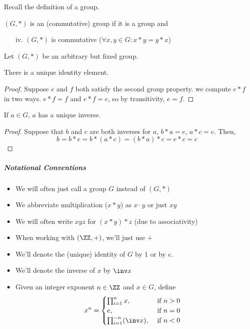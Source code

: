 \documentclass[notes.tex]{subfiles}
\begin{document}

Recall the definition of a group.
\begin{defn}
	$(G, *)$ is an  (commutative) group if it is a group and
\end{defn}
\begin{enumerate}
	\item[iv.] $(G, *)$ is commutative ($\forall x, y\in G: x*y = y*x$)
\end{enumerate}

Let $(G, *)$ be an arbitrary but fixed group.

\begin{proposition}
	There is a unique identity element.
\end{proposition}

\begin{proof}
	Suppose $e$ and $f$ both satisfy the second group property.
	we compute $e*f$ in two ways. $e*f = f$ and $e*f = e$, so by transitivity, $e = f$.
\end{proof}

\begin{proposition}
	If $a\in G$, $a$ has a unique inverse.
\end{proposition}

\begin{proof}
	Suppose that $b$ and $c$ are both inverses for $a$, $b*a = e$, $a*c = e$.
	Then, \[
		b = b*e = b*(a*c) = (b*a) * c = e * c = c
	\]
\end{proof}

\subparagraph{Notational Conventions} %
\label{subp:notational_conventions}
\begin{itemize}
	\item We will often just call a group $G$ instead of $(G, *)$
	\item We abbreviate multiplication ($x*y$) as $x\cdot y$  or just $xy$
	\item We will often write $xyz$ for $(x * y) * z$ (due to associativity)
	\item When working with $(\ZZ, +)$, we'll just use $+$
	\item We'll denote the (unique) identity of $G$ by $1$ or by $e$.
	\item We'll denote the inverse of $x$ by $\inv x$
	\item Given an integer exponent $n\in\ZZ$ and $x\in G$, define 
	\[
		x^n = \begin{cases}
			\prod_{i=1}^{n}x, &\text{ if } n > 0\\
			e, &\text{ if } n = 0\\
			\prod_{i=1}^{-n}(\inv x), &\text{ if } n < 0\\
		\end{cases}
	\]
\end{itemize}
\end{document}
